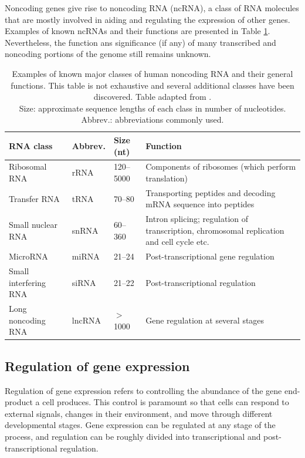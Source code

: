 Noncoding genes give rise to noncoding RNA (ncRNA), a class of RNA molecules that are
mostly involved in aiding and regulating the expression of other genes.
Examples of known ncRNAs and their functions are presented in Table
\ref{table:rnas}. Nevertheless, the function ans significance (if any) of many
transcribed and noncoding portions of the genome still remains unknown.

\begin{table}
  \caption{Examples of known major classes of human noncoding RNA and their
  general functions. This table is not exhaustive and several additional classes have
  been discovered. Table adapted from \citep{Strachan2011}. \\
  Size: approximate sequence lengths of each class in number of nucleotides.
  Abbrev.: abbreviations commonly used.}
  \label{table:rnas}
  \centering
  \begingroup\fontsize{10pt}{12pt}\selectfont
  \begin{tabular}{ lllp{6cm} }
    \hline
    \textbf{RNA class} & \textbf{Abbrev.} & \textbf{Size (nt)} & \textbf{Function} \\
    \hline
    Ribosomal RNA         & rRNA   & 120--5000  & Components of ribosomes (which perform translation) \\
    Transfer RNA          & tRNA   & 70--80     & Transporting peptides and decoding mRNA sequence into peptides \\
    Small nuclear RNA     & snRNA  & 60--360    & Intron splicing; regulation of transcription, chromosomal replication and cell cycle etc.  \\
    MicroRNA              & miRNA  & 21--24     & Post-transcriptional gene regulation \\
    Small interfering RNA & siRNA  & 21--22     & Post-transcriptional regulation \\
    Long noncoding RNA    & lncRNA & $>$ 1000   & Gene regulation at several stages \\
    \hline
    \end{tabular}
    \endgroup
\end{table}




\subsection{Regulation of gene expression}\label{regulation-of-gene-expression}

Regulation of gene expression refers to controlling the abundance of
the gene end-product a cell produces. This control is paramount so that cells
can respond to external signals, changes in their environment, and 
move through different developmental stages. Gene expression can be regulated
at any stage of the process, and regulation can be roughly divided into transcriptional
and post-transcriptional regulation.

